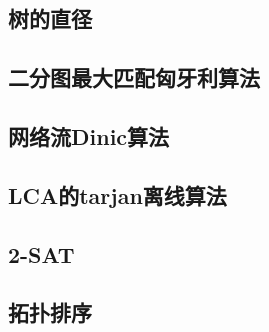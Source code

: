 \subsection{树的直径}


\subsection{二分图最大匹配匈牙利算法}



\subsection{网络流Dinic算法}


\subsection{LCA的tarjan离线算法}


\subsection{2-SAT}



\subsection{拓扑排序}

